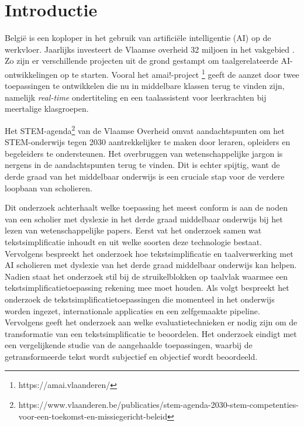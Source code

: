 
\section{Introductie}%
\label{sec:introductie}

België is een koploper in het gebruik van artificiële intelligentie (AI) op de werkvloer. Jaarlijks investeert de Vlaamse overheid 32 miljoen in het vakgebied \autocite{Crevits2022}. Zo zijn er verschillende projecten uit de grond gestampt om taalgerelateerde AI-ontwikkelingen op te starten. Vooral het amai!-project \footnote{https://amai.vlaanderen/} geeft de aanzet door twee toepassingen te ontwikkelen die nu in middelbare klassen terug te vinden zijn, namelijk \textit{real-time} ondertiteling en een taalassistent voor leerkrachten bij meertalige klasgroepen.

Het STEM-agenda\footnote{https://www.vlaanderen.be/publicaties/stem-agenda-2030-stem-competenties-voor-een-toekomst-en-missiegericht-beleid}
van de Vlaamse Overheid omvat aandachtspunten om het STEM-onderwijs tegen 2030 aantrekkelijker te maken door leraren, opleiders en begeleiders te ondersteunen. Het overbruggen van wetenschappelijke jargon is nergens in de aandachtspunten terug te vinden. Dit is echter spijtig, want de derde graad van het middelbaar onderwijs is een cruciale stap voor de verdere loopbaan van scholieren. 

Dit onderzoek achterhaalt welke toepassing het meest conform is aan de noden van een scholier met dyslexie in het derde graad middelbaar onderwijs bij het lezen van wetenschappelijke papers. Eerst vat het onderzoek samen wat tekstsimplificatie inhoudt en uit welke soorten deze technologie bestaat. Vervolgens bespreekt het onderzoek hoe tekstsimplificatie en taalverwerking met AI scholieren met dyslexie van het derde graad middelbaar onderwijs kan helpen. Nadien staat het onderzoek stil bij de struikelblokken op taalvlak waarmee een tekstsimplificatietoepassing rekening mee moet houden. Als volgt bespreekt het onderzoek de tekstsimplificatietoepassingen die momenteel in het onderwijs worden ingezet, internationale applicaties en een zelfgemaakte pipeline. Vervolgens geeft het onderzoek aan welke evaluatietechnieken er nodig zijn om de transformatie van een tekstsimplificatie te beoordelen. Het onderzoek eindigt met een vergelijkende studie van de aangehaalde toepassingen, waarbij de getransformeerde tekst wordt subjectief en objectief wordt beoordeeld.

